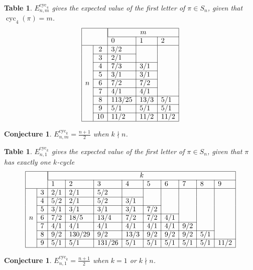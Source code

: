 \documentclass{article}
\newcommand{\n}[1]{\multicolumn{1}{|c|}{#1}}
\newtheorem{conjecture}[theo]{Conjecture}
\newtheorem{datatable}[theo]{Table}
\begin{document}
\begin{datatable} $E_{n,m}^{\text{cyc}_4}$ gives the expected value of the first letter of
  $\pi \in S_n$, given that $\operatorname{cyc}_4(\pi) = m$.
  \[
    \begin{array}{|ll|l|l|l|l|l|l|l|l|l|l|}
    \hline
    & & \multicolumn{3}{|c|}{m} \\ \cline{3-5}
    & & 0 & 1 & 2 \\ \hline
    \multirow{9}{*}{$n$}
    & \n{2}  & 3/2    &      & \\ \cline{2-3}
    & \n{3}  & 2/1    &      & \\ \cline{2-4}
    & \n{4}  & 7/3    & 3/1  & \\ \cline{2-4}
    & \n{5}  & 3/1    & 3/1  & \\ \cline{2-4}
    & \n{6}  & 7/2    & 7/2  & \\ \cline{2-4}
    & \n{7}  & 4/1    & 4/1  & \\ \cline{2-5}
    & \n{8}  & 113/25 & 13/3 & 5/1 \\ \cline{2-5}
    & \n{9}  & 5/1    & 5/1  & 5/1 \\ \cline{2-5}
    & \n{10} & 11/2   & 11/2 & 11/2 \\ \hline
    \end{array}
  \]
\end{datatable}
\begin{conjecture}
  $\displaystyle E_{n,m}^{\text{cyc}_k} = \frac{n + 1}{2} $ when $k \nmid n$.
\end{conjecture}

\begin{datatable} $E_{n,1}^{\text{cyc}_k}$ gives the expected value of the first
  letter of $\pi \in S_n$, given that $\pi$ has exactly one $k$-cycle
\[
  \begin{array}{|ll|l|l|l|l|l|l|l|l|l|l|}
  \hline
  & & \multicolumn{9}{|c|}{k} \\ \cline{3-11}
  & & 1 & 2 & 3 & 4 & 5 & 6 & 7 & 8 & 9 \\ \hline
  \multirow{7}{*}{$n$}
  & \n{3} & 2/1 & 2/1    & 5/2    &      &     &     &     &     &      \\ \cline{2-6}
  & \n{4} & 5/2 & 2/1    & 5/2    & 3/1  &     &     &     &     &      \\ \cline{2-7}
  & \n{5} & 3/1 & 3/1    & 3/1    & 3/1  & 7/2 &     &     &     &      \\ \cline{2-8}
  & \n{6} & 7/2 & 18/5   & 13/4   & 7/2  & 7/2 & 4/1 &     &     &      \\ \cline{2-9}
  & \n{7} & 4/1 & 4/1    & 4/1    & 4/1  & 4/1 & 4/1 & 9/2 &     &      \\ \cline{2-10}
  & \n{8} & 9/2 & 130/29 & 9/2    & 13/3 & 9/2 & 9/2 & 9/2 & 5/1 &      \\ \cline{2-11}
  & \n{9} & 5/1 & 5/1    & 131/26 & 5/1  & 5/1 & 5/1 & 5/1 & 5/1 & 11/2 \\ \hline
  \end{array}
\]
\end{datatable}
\begin{conjecture}
  $\displaystyle E_{n,1}^{\text{cyc}_k} = \frac{n + 1}{2} $ when $k = 1$ or $k \nmid n$.
\end{conjecture}
\end{document}
